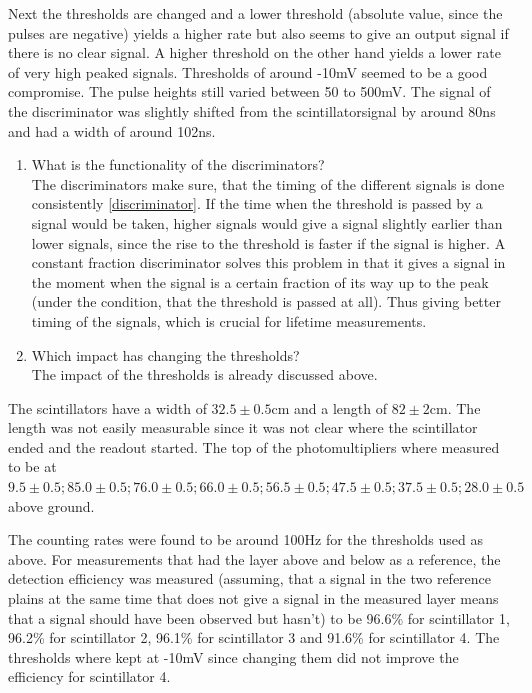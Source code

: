 Next the thresholds are changed and a lower threshold (absolute value, since the pulses are negative) yields a higher rate but also seems to give an output signal if there is no clear signal. A higher threshold on the other hand yields a lower rate of very high peaked signals. Thresholds of around -10mV seemed to be a good compromise. The pulse heights still varied between 50 to 500mV. The signal of the discriminator was slightly shifted from the scintillatorsignal by around 80ns and had a width of around 102ns. 

\begin{enumerate}
\item What is the functionality of the discriminators?\\
The discriminators make sure, that the timing of the different signals is done consistently \ref{discriminator}. If the time when the threshold is passed by a signal would be taken, higher signals would give a signal slightly earlier than lower signals, since the rise to the threshold is faster if the signal is higher. A constant fraction discriminator solves this problem in that it gives a signal in the moment when the signal is a certain fraction of its way up to the peak (under the condition, that the threshold is passed at all). Thus giving better timing of the signals, which is crucial for lifetime measurements.  
\item Which impact has changing the thresholds?\\
The impact of the thresholds is already discussed above. 
\end{enumerate}

The scintillators have a width of $32.5\pm0.5$cm and a length of $82\pm2$cm. The length was not easily measurable since it was not clear where the scintillator ended and the readout started. The top of the photomultipliers where measured to be at $9.5 \pm 0.5; 85.0 \pm 0.5; 76.0 \pm 0.5; 66.0 \pm 0.5; 56.5 \pm 0.5; 47.5 \pm 0.5; 37.5 \pm 0.5; 28.0 \pm 0.5$ above ground. 

The counting rates were found to be around 100Hz for the thresholds used as above. For measurements that had the layer above and below as a reference, the detection efficiency was measured (assuming, that a signal in the two reference plains at the same time that does not give a signal in the measured layer means that a signal should have been observed but hasn't) to be 96.6\% for scintillator 1, 96.2\% for scintillator 2, 96.1\% for scintillator 3 and 91.6\% for scintillator 4. The thresholds where kept at -10mV since changing them did not improve the efficiency for scintillator 4. 

